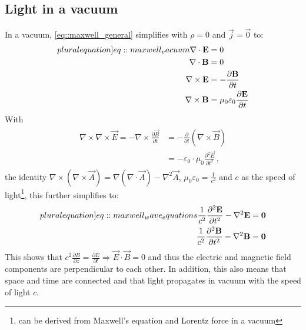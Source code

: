 \subsection{Light in a vacuum}
%
In a vacuum, \cref{eq::maxwell_general} simplifies with $\rho = 0$ and $\vec{j} = \vec{0}$ to:
%
\begin{align}
\begin{split} \label[pluralequation]{eq::maxwell_vacuum}
  \nabla \cdot \vec{E} &= 0 \quad\\
  \nabla \cdot \vec{B} &= 0 \quad\\
  \nabla \times \vec{E} &= -\frac{\partial\vec B}{\partial t}\\
  \nabla \times \vec{B} &= \mu_0\varepsilon_0 \frac{\partial\vec E}{\partial t}
  \end{split}
\end{align}
%
With
\begin{align}
\begin{split}
    \nabla \times \nabla \times \vec{E} = -\nabla \times \frac{\partial \vec{B}} {\partial t} &= -\frac{\partial} {\partial t} \left( \nabla \times  \vec{B} \right)\\
    &= -\varepsilon_0 \cdot \mu_0 \frac{\partial^2 \vec{E}}{\partial t^2} \, ,
\end{split}
\end{align}
%
the identity $\nabla \times \left( \nabla \times \vec{A} \right) = \nabla(\nabla \cdot \vec{A}) - \nabla^{2}\vec{A}$, $\mu_0\varepsilon_0 = \frac{1}{c^2}$ and $c$ as the speed of light\footnote{can be derived from Maxwell's equation and Lorentz force in a vacuum}, this further simplifies to:
%
\begin{align}
\begin{split} \label[pluralequation]{eq::maxwell_wave_equations}
  \frac{1}{c^2} \frac{\partial^2 \vec{E}}{\partial t^2} - \nabla^2 \vec{E} &= \vec{0} \\
  \frac{1}{c^2} \frac{\partial^2 \vec{B}}{\partial t^2} - \nabla^2 \vec{B} &= \vec{0}
\end{split}
\end{align}
%
This shows that $c^2 \frac{\partial B} {\partial z} = \frac{\partial E}{\partial t} \Rightarrow \vec{E} \cdot \vec{B} = 0$ and thus the electric and magnetic field components are perpendicular to each other.
In addition, this also means that space and time are connected and that light propagates in vacuum with the speed of light $c$.
%
